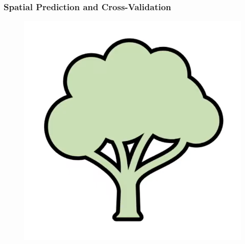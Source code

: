 \documentclass[
  shownotes,
  xcolor={svgnames},
  hyperref={colorlinks,citecolor=DarkBlue,linkcolor=andesred,urlcolor=DarkBlue}
  , aspectratio=169]{beamer}
\begin{document}
\begin{frame}[fragile]
\frametitle{Spatial Prediction and Cross-Validation}

  \begin{minipage}[c]{0.6\linewidth}
        
      \begin{figure}[H] \centering
        \captionsetup{justification=centering}
        \includegraphics[scale=0.4]{figures/spatial_cross/fig01.png}
      \end{figure}
           
    \end{minipage}
    \hfill
    \begin{minipage}[t]{0.35\linewidth}%
    

    \end{minipage}


\end{frame}
\end{document}
